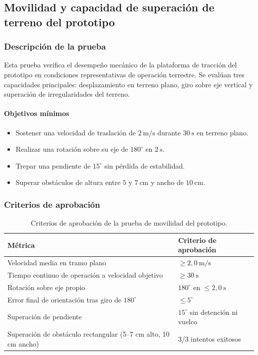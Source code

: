 \subsection{Movilidad y capacidad de superación de terreno del prototipo}

\subsubsection{Descripción de la prueba}

Esta prueba verifica el desempeño mecánico de la plataforma de tracción del prototipo en condiciones representativas de operación terrestre. Se evalúan tres capacidades principales: desplazamiento en terreno plano, giro sobre eje vertical y superación de irregularidades del terreno.

\paragraph{Objetivos mínimos}
\begin{itemize}
    \item Sostener una velocidad de traslación de $2\ \text{m/s}$ durante $30\ \text{s}$ en terreno plano.
    \item Realizar una rotación sobre su eje de $180^\circ$ en $2\ \text{s}$.
    \item Trepar una pendiente de $15^\circ$ sin pérdida de estabilidad.
    \item Superar obstáculos de altura entre $5$ y $7\ \text{cm}$ y ancho de $10\ \text{cm}$.
\end{itemize}

\subsubsection{Criterios de aprobación}

\begin{table}[H]
\centering
\small
\begin{tabular}{p{8.8cm} p{4.1cm}}
\toprule
\textbf{Métrica} & \textbf{Criterio de aprobación} \\
\midrule
Velocidad media en tramo plano & $\geq 2{,}0\ \text{m/s}$ \\
Tiempo continuo de operación a velocidad objetivo & $\geq 30\ \text{s}$ \\
Rotación sobre eje propio & $180^\circ$ en $\leq 2{,}0\ \text{s}$ \\
Error final de orientación tras giro de $180^\circ$ & $\leq 5^\circ$ \\
Superación de pendiente & $15^\circ$ sin detención ni vuelco \\
Superación de obstáculo rectangular (5--7 cm alto, 10 cm ancho) & 3/3 intentos exitosos \\
\bottomrule
\end{tabular}
\caption{Criterios de aprobación de la prueba de movilidad del prototipo.}
\label{tab:criterios_prueba_movilidad}
\end{table}

